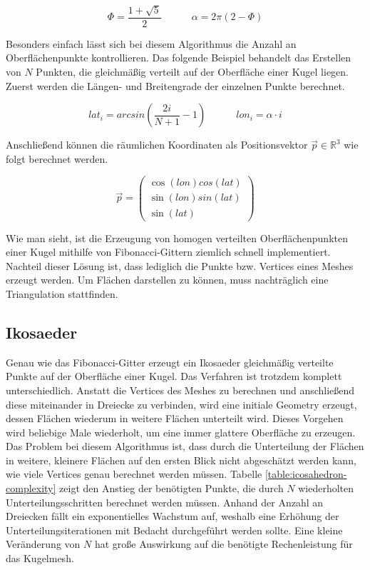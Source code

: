 $$\Phi = \frac{1 + \sqrt{5}}{2} \quad\quad\quad \alpha = 2\pi\left(2 - \Phi\right)$$

Besonders einfach lässt sich bei diesem Algorithmus die Anzahl an Oberflächenpunkte
kontrollieren. Das folgende Beispiel behandelt das Erstellen von $N$ Punkten,
die gleichmäßig verteilt auf der Oberfläche einer Kugel liegen. Zuerst werden
die Längen- und Breitengrade der einzelnen Punkte berechnet.

$$lat_i = arcsin\left(\frac{2i}{N + 1} - 1\right) \quad\quad\quad
lon_i = \alpha \cdot i$$

Anschließend können die räumlichen Koordinaten als Positionsvektor $\vec{p} \in
\mathbb{R}^3$ wie folgt berechnet werden.

\[
\vec{p} =
\left(\begin{array}{c}
    \cos\left(lon\right) cos\left(lat\right) \\
    \sin\left(lon\right) sin\left(lat\right) \\
    \sin\left(lat\right)
\end{array}\right)
\]

Wie man sieht, ist die Erzeugung von homogen verteilten Oberflächenpunkten einer
Kugel mithilfe von Fibonacci-Gittern ziemlich schnell implementiert. Nachteil
dieser Lösung ist, dass lediglich die Punkte bzw. Vertices eines Meshes erzeugt
werden. Um Flächen darstellen zu können, muss nachträglich eine Triangulation
stattfinden. 

\subsection{Ikosaeder}
Genau wie das Fibonacci-Gitter erzeugt ein Ikosaeder gleichmäßig verteilte
Punkte auf der Oberfläche einer Kugel. Das Verfahren ist trotzdem komplett
unterschiedlich. Anstatt die Vertices des Meshes zu berechnen und
anschließend diese miteinander in Dreiecke zu verbinden, wird eine initiale
Geometry erzeugt, dessen Flächen wiederum in weitere Flächen unterteilt wird.
Dieses Vorgehen wird beliebige Male wiederholt, um eine immer glattere
Oberfläche zu erzeugen. Das Problem bei diesem Algorithmus ist, dass durch
die Unterteilung der Flächen in weitere, kleinere Flächen auf den ersten
Blick nicht abgeschätzt werden kann, wie viele Vertices genau berechnet
werden müssen. Tabelle \ref{table:icosahedron-complexity} zeigt den Anstieg
der benötigten Punkte, die durch $N$ wiederholten Unterteilungsschritten
berechnet werden müssen. Anhand der Anzahl an Dreiecken fällt ein
exponentielles Wachstum auf, weshalb eine Erhöhung der
Unterteilungsiterationen mit Bedacht durchgeführt werden sollte. Eine kleine
Veränderung von $N$ hat große Auswirkung auf die benötigte Rechenleistung für
das Kugelmesh.

